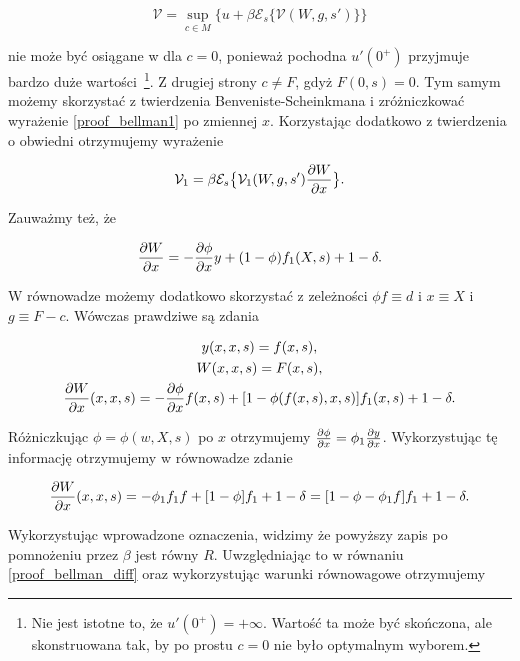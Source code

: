 \begin{equation}\label{proof_bellman1}
\mathcal{V} = \underset{c \in M}{\sup} \Biggl\{ u + \beta \mathcal{E}_s \bigl \{ \mathcal{V}(W, g, s') \bigl\} \Biggl\}
\end{equation}
	
nie może być osiągane w dla $ c = 0 $, ponieważ pochodna $ u'(0^{+}) $ przyjmuje bardzo duże wartości~\footnote{Nie jest istotne to, że $ u'(0^{+}) = + \infty$. Wartość ta może być skończona, ale skonstruowana tak, by po prostu $ c=0 $ nie było optymalnym wyborem.}. Z drugiej strony $ c \not = F $, gdyż $ F(0,s) = 0 $. Tym samym możemy skorzystać z twierdzenia Benveniste-Scheinkmana i zróżniczkować wyrażenie \ref{proof_bellman1} po zmiennej $ x $. Korzystając dodatkowo z twierdzenia o obwiedni otrzymujemy wyrażenie

\begin{equation}\label{proof_bellman_diff}
\mathcal{V}_1 = \beta	\mathcal{E}_s \bigl \{ \mathcal{V}_1 (W, g,s') \frac{\partial W}{\partial x}  \bigl \}.
\end{equation}
		
Zauważmy też, że 

\begin{equation*}
\frac{\partial W}{\partial x} = - \frac{\partial \phi}{\partial x} y  + (1 - \phi) f_1(X,s) + 1 - \delta.
\end{equation*}		
	
W równowadze możemy dodatkowo skorzystać z zeleżności $ \phi f \equiv d $ i $x \equiv X$ i $ g \equiv F - c $. Wówczas prawdziwe są zdania

\begin{gather*}
y(x,x,s) = f(x,s), \\
W(x,x,s) = F(x,s), \\
\frac{\partial W}{\partial x}(x,x,s) = - \frac{\partial \phi}{\partial x}f(x,s) + [1- \phi(f(x,s),x,s)]f_1 (x,s) + 1 - \delta.
\end{gather*}
		
Różniczkując $ \phi = \phi (w, X, s) $ po $ x $ otrzymujemy $ \frac{\partial \phi}{\partial x} = \phi_1 \frac{\partial y}{\partial x} $. Wykorzystując tę informację otrzymujemy w równowadze zdanie

\begin{equation*}
\frac{\partial W}{\partial x}(x,x,s) = - \phi_1 f_1 f + [1- \phi]f_1 + 1-\delta = [1 - \phi - \phi_1 f]f_1 + 1-\delta.
\end{equation*}
		
Wykorzystując wprowadzone oznaczenia, widzimy że powyższy zapis po pomnożeniu przez $\beta$ jest równy $R$. Uwzględniając to w równaniu \ref{proof_bellman_diff} oraz wykorzystując warunki równowagowe otrzymujemy

